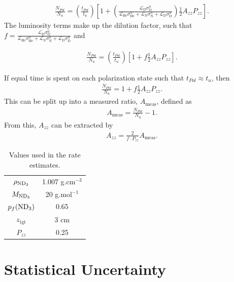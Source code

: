\documentclass[11pt]{article}
\begin{document}
\begin{eqnarray}
\frac{N_{Pol}}{N_u} = \left( \frac{t_{Pol}}{t_u}\right) \left[1 + \left( \frac{\mathcal{L}_{\mathrm{D}}\sigma_{\mathrm{D}}^u}{ \mathcal{L}_{\mathrm{He}} \sigma_{\mathrm{He}}^u  + \mathcal{L}_{\mathrm{N}} \sigma_{\mathrm{N}}^u + \mathcal{L}_{\mathrm{D}}\sigma_{\mathrm{D}}^u } \right) \frac{1}{2} A_{zz}  P_{zz}\right].
\end{eqnarray}
The luminosity terms make up the dilution factor, such that $f=\frac{\mathcal{L}_{\mathrm{D}}\sigma_{\mathrm{D}}^u}{ \mathcal{L}_{\mathrm{He}} \sigma_{\mathrm{He}}^u  + \mathcal{L}_{\mathrm{N}} \sigma_{\mathrm{N}}^u + \mathcal{L}_{\mathrm{D}}\sigma_{\mathrm{D}}^u }$ and

\begin{eqnarray}
\frac{N_{Pol}}{N_u} = \left( \frac{t_{Pol}}{t_u}\right) \left[1 + f \frac{1}{2} A_{zz}  P_{zz}\right].
\end{eqnarray}

If equal time is spent on each polarization state such that $t_{Pol} \approx t_u$, then
\begin{eqnarray}
\frac{N_{Pol}}{N_u} =  1 + f \frac{1}{2} A_{zz}  P_{zz}.
\end{eqnarray}
This can be split up into a measured ratio, $A_{\mathrm{meas}}$, defined as
\begin{eqnarray}
A_{\mathrm{meas}} = \frac{N_{Pol}}{N_u} - 1.
\end{eqnarray}
From this, $A_{zz}$ can be extracted by
\begin{eqnarray}
A_{zz} = \frac{2  }{f \cdot P_{zz}}A_{\mathrm{meas}}.
\end{eqnarray}




\begin{table}[htdp]
\caption{Values used in the rate estimates.}
\begin{center}
\begin{tabular}{|c|c|}
\hline
$\rho_{\rm ND_3}$	&	1.007 g.cm$^{-3}$ \\
$M_{\rm ND_3}$		&	20 g.mol$^{-1}$ \\
$p_f({\rm ND_3})$	&	0.65 \\
$z_{\mathrm{tgt}}$	&	3 cm \\
$P_{zz}$				&	0.25 \\
\hline
\end{tabular}
\end{center}
\label{default}
\end{table}%

\section{Statistical Uncertainty}
\label{stat-sec}
\end{document}
